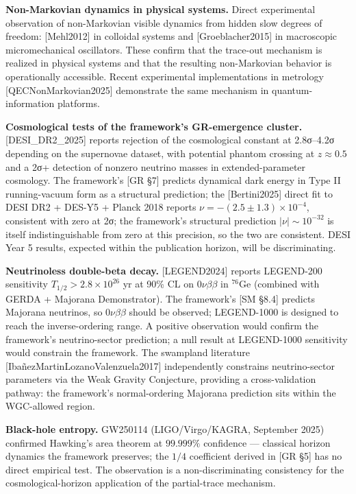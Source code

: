 \documentclass[
]{article}
\begin{document}
\textbf{Non-Markovian dynamics in physical systems.} Direct experimental
observation of non-Markovian visible dynamics from hidden slow degrees
of freedom: {[}Mehl2012{]} in colloidal systems and
{[}Groeblacher2015{]} in macroscopic micromechanical oscillators. These
confirm that the trace-out mechanism is realized in physical systems and
that the resulting non-Markovian behavior is operationally accessible.
Recent experimental implementations in metrology
{[}QECNonMarkovian2025{]} demonstrate the same mechanism in
quantum-information platforms.

\textbf{Cosmological tests of the framework's GR-emergence cluster.}
{[}DESI\_DR2\_2025{]} reports rejection of the cosmological constant at
2.8σ--4.2σ depending on the supernovae dataset, with potential phantom
crossing at \(z \approx 0.5\) and a 2σ+ detection of nonzero neutrino
masses in extended-parameter cosmology. The framework's {[}GR §7{]}
predicts dynamical dark energy in Type II running-vacuum form as a
structural prediction; the {[}Bertini2025{]} direct fit to DESI DR2 +
DES-Y5 + Planck 2018 reports \(\nu = -(2.5 \pm 1.3) \times 10^{-4}\),
consistent with zero at 2σ; the framework's structural prediction
\(|\nu| \sim 10^{-32}\) is itself indistinguishable from zero at this
precision, so the two are consistent. DESI Year 5 results, expected
within the publication horizon, will be discriminating.

\textbf{Neutrinoless double-beta decay.} {[}LEGEND2024{]} reports
LEGEND-200 sensitivity \(T_{1/2} > 2.8 \times 10^{26}\) yr at 90\% CL on
\(0\nu\beta\beta\) in \(^{76}\)Ge (combined with GERDA + Majorana
Demonstrator). The framework's {[}SM §8.4{]} predicts Majorana
neutrinos, so \(0\nu\beta\beta\) should be observed; LEGEND-1000 is
designed to reach the inverse-ordering range. A positive observation
would confirm the framework's neutrino-sector prediction; a null result
at LEGEND-1000 sensitivity would constrain the framework. The swampland
literature {[}IbañezMartinLozanoValenzuela2017{]} independently
constrains neutrino-sector parameters via the Weak Gravity Conjecture,
providing a cross-validation pathway: the framework's normal-ordering
Majorana prediction sits within the WGC-allowed region.

\textbf{Black-hole entropy.} GW250114 (LIGO/Virgo/KAGRA, September 2025)
confirmed Hawking's area theorem at \(99.999\%\) confidence ---
classical horizon dynamics the framework preserves; the \(1/4\)
coefficient derived in {[}GR §5{]} has no direct empirical test. The
observation is a non-discriminating consistency for the
cosmological-horizon application of the partial-trace mechanism.
\end{document}
